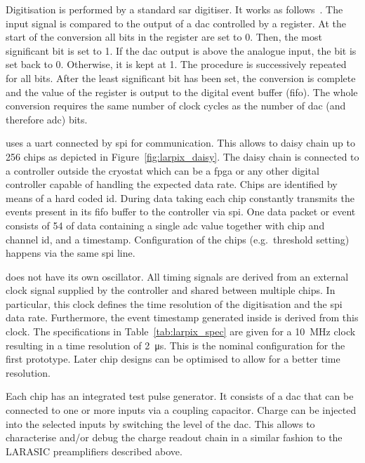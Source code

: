Digitisation is performed by a standard \gls{sar} digitiser.
It works as follows~\cite{horowitzHill}.
The input signal is compared to the output of a \gls{dac} controlled by a register.
At the start of the conversion all bits in the register are set to \num{0}.
Then, the most significant bit is set to \num{1}.
If the \gls{dac} output is above the analogue input, the bit is set back to \num{0}.
Otherwise, it is kept at \num{1}.
The procedure is successively repeated for all bits.
After the least significant bit has been set, the conversion is complete and the value of the register is output to the digital event buffer (\gls{fifo}).
The whole conversion requires the same number of clock cycles as the number of \gls{dac} (and therefore \gls{adc}) bits.

\larpix{} uses a \gls{uart} connected by \gls{spi} for communication.
This allows to daisy chain up to \num{256} \larpix{} chips as depicted in Figure~\ref{fig:larpix_daisy}.
The daisy chain is connected to a \larpix{} controller outside the cryostat which can be a \gls{fpga} or any other digital controller capable of handling the expected data rate.
Chips are identified by means of a hard coded \gls{id}.
During data taking each \larpix{} chip constantly transmits the events present in its \gls{fifo} buffer to the controller via \gls{spi}.
One data packet or event consists of \SI{54}{\bit} of data containing a single \gls{adc} value together with chip and channel \gls{id}, and a timestamp.
Configuration of the \larpix{} chips (e.g.\ threshold setting) happens via the same \gls{spi} line.

\larpix{} does not have its own oscillator.
All timing signals are derived from an external clock signal supplied by the controller and shared between multiple chips.
In particular, this clock defines the time resolution of the digitisation and the \gls{spi} data rate.
Furthermore, the event timestamp generated inside \larpix{} is derived from this clock.
The specifications in Table~\ref{tab:larpix_spec} are given for a \SI{10}{\mega\hertz} clock resulting in a time resolution of \SI{2}{\micro\second}.
This is the nominal configuration for the first prototype.
Later chip designs can be optimised to allow for a better time resolution.

Each \larpix{} chip has an integrated test pulse generator.
It consists of a \gls{dac} that can be connected to one or more inputs via a coupling capacitor.
Charge can be injected into the selected inputs by switching the level of the \gls{dac}.
This allows to characterise and/or debug the charge readout chain in a similar fashion to the LARASIC preamplifiers described above.

